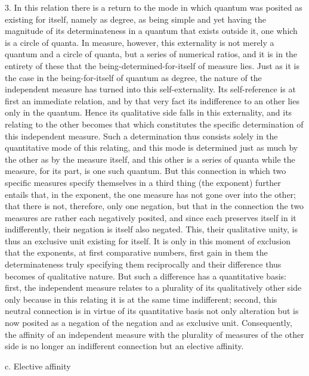 3. In this relation there is a return to the mode
in which quantum was posited as existing for itself,
namely as degree, as being simple
and yet having the magnitude of its determinateness
in a quantum that exists outside it,
one which is a circle of quanta.
In measure, however, this externality is not
merely a quantum and a circle of quanta,
but a series of numerical ratios,
and it is in the entirety of these that
the being-determined-for-itself of measure lies.
Just as it is the case in the being-for-itself of quantum as degree,
the nature of the independent measure has turned into this self-externality.
Its self-reference is at first an immediate relation,
and by that very fact its indifference to an other
lies only in the quantum.
Hence its qualitative side falls in this externality,
and its relating to the other becomes
that which constitutes the specific determination
of this independent measure.
Such a determination thus consists solely
in the quantitative mode of this relating,
and this mode is determined just as much by the other
as by the measure itself,
and this other is a series of quanta
while the measure, for its part,
is one such quantum.
But this connection in which two specific measures
specify themselves in a third thing (the exponent) further entails that,
in the exponent, the one measure has not gone over into the other;
that there is not, therefore, only one negation,
but that in the connection the two measures are
rather each negatively posited,
and since each preserves itself in it indifferently,
their negation is itself also negated.
This, their qualitative unity, is thus
an exclusive unit existing for itself.
It is only in this moment of exclusion
that the exponents, at first comparative numbers,
first gain in them the determinateness
truly specifying them reciprocally
and their difference thus becomes of qualitative nature.
But such a difference has a quantitative basis:
first, the independent measure relates to a plurality
of its qualitatively other side only because
in this relating it is at the same time indifferent;
second, this neutral connection is in virtue of
its quantitative basis not only alteration
but is now posited as a negation of the negation
and as exclusive unit.
Consequently, the affinity of an independent measure
with the plurality of measures of the other side is
no longer an indifferent connection but an elective affinity.

c. Elective affinity

